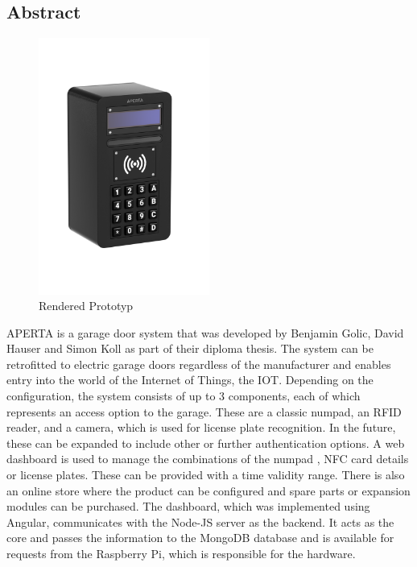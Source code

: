 \begin{spacing}{1}
  \chapter*{Abstract}
\end{spacing}
\begin{figure}
  \begin{center}
    \includegraphics[width=0.5\textwidth]{pics/all-in-package.png}
    \caption{Rendered Prototyp}
  \end{center}
\end{figure}
APERTA is a garage door system that was developed by Benjamin Golic, David Hauser and Simon Koll as part of their diploma thesis. The system can be retrofitted to electric garage doors regardless of the manufacturer and enables entry into the world of the Internet of Things, the IOT. Depending on the configuration, the system consists of up to 3 components, each of which represents an access option to the garage. These are a classic numpad, an RFID reader, and a camera, which is used for license plate recognition. In the future, these can be expanded to include other or further authentication options. A web dashboard is used to manage the combinations of the numpad , NFC card details or license plates. These can be provided with a time validity range. There is also an online store where the product can be configured and spare parts or expansion modules can be purchased. The dashboard, which was implemented using Angular, communicates with the Node-JS server as the backend. It acts as the core and passes the information to the MongoDB database and is available for requests from the Raspberry Pi, which is responsible for the hardware.

